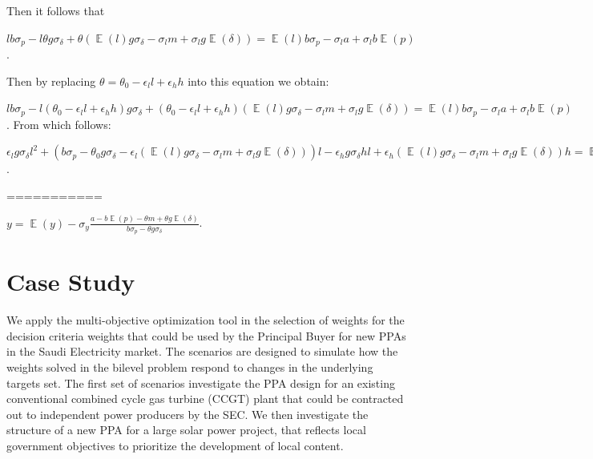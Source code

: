 \documentclass[informs]{informs3}
\begin{document}
Then it follows that

$l b\sigma_{p}-l\theta g\sigma_{\delta} +
\theta\left(\mathop{\mathbb{E}}\left(l\right)g\sigma_{\delta}
-\sigma_{l} m
+\sigma_{l} g \mathop{\mathbb{E}}\left(\delta\right)\right)=
\mathop{\mathbb{E}}\left(l\right)b\sigma_{p}-  \sigma_{l} a+\sigma_{l}b \mathop{\mathbb{E}}\left(p\right)$.


Then by replacing $\theta = \theta_0-\epsilon_l l +\epsilon_h h$ into this equation we obtain:

$l b\sigma_{p}-l\left(\theta_0-\epsilon_l l +\epsilon_h h\right) g\sigma_{\delta} +
\left(\theta_0-\epsilon_l l +\epsilon_h h\right)\left(\mathop{\mathbb{E}}\left(l\right)g\sigma_{\delta}
-\sigma_{l} m
+\sigma_{l} g \mathop{\mathbb{E}}\left(\delta\right)\right)=
\mathop{\mathbb{E}}\left(l\right)b\sigma_{p}-  \sigma_{l} a+\sigma_{l}b \mathop{\mathbb{E}}\left(p\right)$.
From which follows:

$\epsilon_l g\sigma_{\delta} l^{2}+\left(b\sigma_{p}-\theta_0g\sigma_{\delta}-\epsilon_l\left(\mathop{\mathbb{E}}\left(l\right)g\sigma_{\delta}
-\sigma_{l} m
+\sigma_{l} g \mathop{\mathbb{E}}\left(\delta\right)\right)\right)l-\epsilon_h g\sigma_{\delta} hl 
+
\epsilon_h\left(\mathop{\mathbb{E}}\left(l\right)g\sigma_{\delta}
-\sigma_{l} m
+\sigma_{l} g \mathop{\mathbb{E}}\left(\delta\right)\right)h
=
\mathop{\mathbb{E}}\left(l\right)b\sigma_{p}-  \sigma_{l} a+\sigma_{l}b \mathop{\mathbb{E}}\left(p\right)
-\theta_0\left(\mathop{\mathbb{E}}\left(l\right)g\sigma_{\delta}
-\sigma_{l} m
+\sigma_{l} g \mathop{\mathbb{E}}\left(\delta\right)\right)$.


===========


$y =\mathop{\mathbb{E}}\left(y\right)-  \sigma_{y} \frac{a-b \mathop{\mathbb{E}}\left(p\right)-\theta m+\theta g \mathop{\mathbb{E}}\left(\delta\right)}{b\sigma_{p}-\theta g\sigma_{\delta}}$.\Halmos
\endproof





\section{Case Study}\label{Section_CaseStudy}

We apply the multi-objective optimization tool in the selection of weights for the decision criteria weights that could be used by the Principal Buyer for new PPAs in the Saudi Electricity market. The scenarios are designed to simulate how the weights solved in the bilevel problem respond to changes in the underlying targets set.  The first set of scenarios investigate the PPA design for an existing conventional combined cycle gas turbine (CCGT) plant that could be contracted out to independent power producers by the SEC. We then investigate the structure of a new PPA for a large solar power project, that reflects local government objectives to prioritize the development of local content. 
\end{document}
